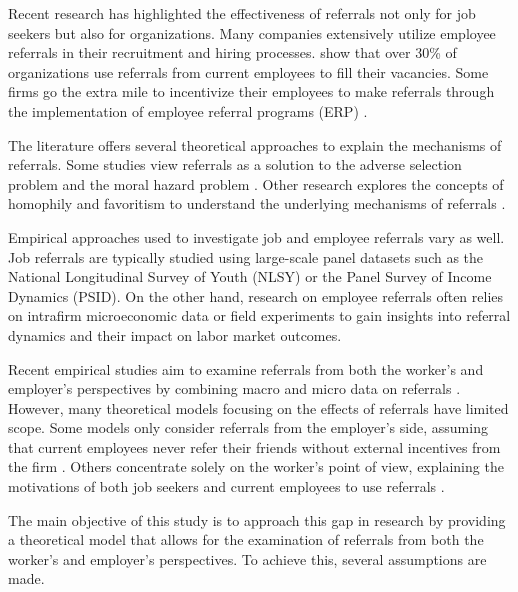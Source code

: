 \documentclass[12pt]{article}
\begin{document}
Recent research has highlighted the effectiveness of referrals not only for job seekers but also for organizations. Many companies extensively utilize employee referrals in their recruitment and hiring processes. \cite{holzer1987hiring, neckerman1991hiring, marsden2001social} show that over 30\% of organizations use referrals from current employees to fill their vacancies. Some firms go the extra mile to incentivize their employees to make referrals through the implementation of employee referral programs (ERP) \citep{ekinci2016employee, friebel2023employee}. 

The literature offers several theoretical approaches to explain the mechanisms of referrals. Some studies view referrals as a solution to the adverse selection problem \citep{rees1966information, saloner1985old, ekinci2016employee} and the moral hazard problem \citep{kugler2003employee, castilla2005social, heath2018firms}. Other research explores the concepts of homophily and favoritism to understand the underlying mechanisms of referrals \citep{montgomery1991social, beaman2012gets, galenianos2013learning}.

Empirical approaches used to investigate job and employee referrals vary as well. Job referrals are typically studied using large-scale panel datasets such as the National Longitudinal Survey of Youth (NLSY) or the Panel Survey of Income Dynamics (PSID). On the other hand, research on employee referrals often relies on intrafirm microeconomic data \citep{burks2015value} or field experiments \citep{beaman2012gets, friebel2023employee} to gain insights into referral dynamics and their impact on labor market outcomes.

Recent empirical studies aim to examine referrals from both the worker's and employer's perspectives by combining macro and micro data on referrals \citep{levati2020impact, lester2021heterogeneous}. However, many theoretical models focusing on the effects of referrals have limited scope. Some models only consider referrals from the employer's side, assuming that current employees never refer their friends without external incentives from the firm \citep{ekinci2016employee}. Others concentrate solely on the worker's point of view, explaining the motivations of both job seekers and current employees to use referrals \citep{lester2021heterogeneous}.

The main objective of this study is to approach this gap in research by providing a theoretical model that allows for the examination of referrals from both the worker's and employer's perspectives. To achieve this, several assumptions are made. 
\end{document}
